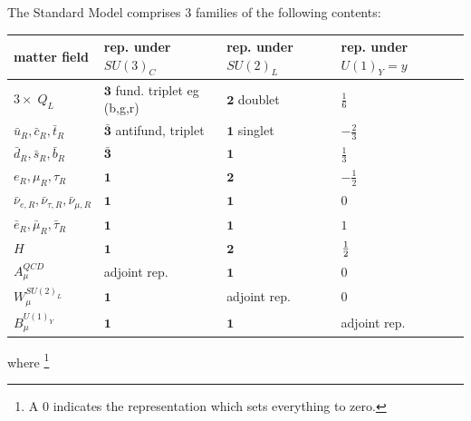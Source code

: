  The Standard Model comprises $3$ families of the following contents:
 \begin{tabular}{|l|lll|}
 	matter field          & rep. under $SU(3)_C$ & rep. under $SU(2)_L$ & rep. under $U(1)_Y=y$\\
 	\toprule
      $3\times \; Q_L$ & $\mathbf{3}$ fund. triplet eg (b,g,r)& $\mathbf{2}$ doublet & $\frac{1}{6}$\\
      $ \bar{u}_R,\bar{c}_R,\bar{t}_R$ & $\bar{\mathbf{3}}$ antifund, triplet & $\mathbf{1}$ singlet & $-\frac{2}{3}$\\
      $ \bar{d}_R, \bar{s}_R, \bar{b}_R$ & $\bar{\mathbf{3}}$ & $\mathbf{1}$& $\frac{1}{3}$ \\
  \midrule
  $e_R,\mu_R,\tau_R$ & $\mathbf{1}$ &$\mathbf{2}$ &$-\frac{1}{2}$ \\
  $\bar{ \nu}_{e,R},\bar{\nu}_{\tau,R},\bar{\nu}_{\mu,R}$ & $\mathbf{1}$ & $\mathbf{1}$ & $0$ \\
  $ \bar{e}_R,\bar{\mu}_R,\bar{\tau}_R$& $\mathbf{1}$& $\mathbf{1}$&$1$\\
  \midrule
  $H$ & $\mathbf{1}$ & $\mathbf{2}$ & $\frac{1}{2}$\\
  \bottomrule
  $A^{QCD}_\mu$ & adjoint rep. & $\mathbf{1}$ & 0\\
  $W^{SU(2)_L}_\mu$ & $\mathbf{1}$ &adjoint rep. & 0 \\
  $B^{U(1)_Y}_\mu$ & $\mathbf{1}$& $\mathbf{1 }$& adjoint rep. \\
 \end{tabular}
where \footnote{A $0$ indicates the representation which sets everything to zero.}
